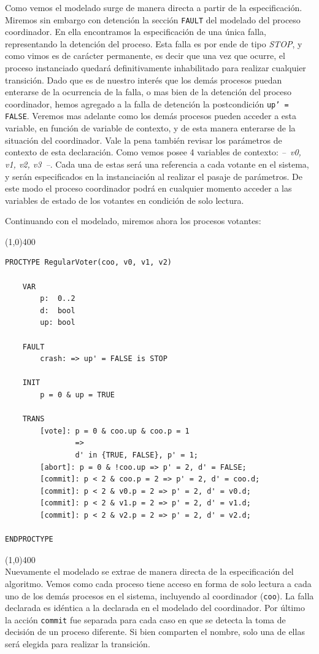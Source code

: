 \documentclass[pdftex,a4paper,12pt]{book}
\begin{document}
Como vemos el modelado surge de manera directa a partir de la especificaci\'on. Miremos sin embargo con detenci\'on la secci\'on \texttt{FAULT} del modelado del proceso coordinador. En ella encontramos la especificaci\'on de una \'unica falla, representando la detenci\'on del proceso. Esta falla es por ende de tipo \textit{STOP}, y como vimos es de car\'acter permanente, es decir que una vez que ocurre, el proceso instanciado quedar\'a definitivamente inhabilitado para realizar cualquier transici\'on. Dado que es de nuestro inter\'es que los dem\'as procesos puedan enterarse de la ocurrencia de la falla, o mas bien de la detenci\'on del proceso coordinador, hemos agregado a la falla de detenci\'on la postcondici\'on \texttt{up' = FALSE}. Veremos mas adelante como los dem\'as procesos pueden acceder a esta variable, en funci\'on de variable de contexto, y de esta manera enterarse de la situaci\'on del coordinador. Vale la pena tambi\'en revisar los par\'ametros de contexto de esta declaraci\'on. Como vemos posee 4 variables de contexto: \textit{--~v0, v1, v2, v3~--}. Cada una de estas ser\'a una referencia a cada votante en el sistema, y ser\'an especificados en la instanciaci\'on al realizar el pasaje de par\'ametros. De este modo el proceso coordinador podr\'a en cualquier momento acceder a las variables de estado de los votantes en condici\'on de solo lectura.

Continuando con el modelado, miremos ahora los procesos votantes:

\noindent \line(1,0){400}
\begin{verbatim}
PROCTYPE RegularVoter(coo, v0, v1, v2)
    
    VAR
        p:  0..2
        d:  bool
        up: bool

    FAULT
        crash: => up' = FALSE is STOP
    
    INIT
        p = 0 & up = TRUE

    TRANS
        [vote]: p = 0 & coo.up & coo.p = 1
                => 
                d' in {TRUE, FALSE}, p' = 1;
        [abort]: p = 0 & !coo.up => p' = 2, d' = FALSE;
        [commit]: p < 2 & coo.p = 2 => p' = 2, d' = coo.d;
        [commit]: p < 2 & v0.p = 2 => p' = 2, d' = v0.d;
        [commit]: p < 2 & v1.p = 2 => p' = 2, d' = v1.d;
        [commit]: p < 2 & v2.p = 2 => p' = 2, d' = v2.d;

ENDPROCTYPE
\end{verbatim}
\line(1,0){400}
~\\

Nuevamente el modelado se extrae de manera directa de la especificaci\'on del algoritmo. Vemos como cada proceso tiene acceso en forma de solo lectura a cada uno de los dem\'as procesos en el sistema, incluyendo al coordinador (\texttt{coo}). La falla declarada es id\'entica a la declarada en el modelado del coordinador. Por \'ultimo la acci\'on \texttt{commit} fue separada para cada caso en que se detecta la toma de decisi\'on de un proceso diferente. Si bien comparten el nombre, solo una de ellas ser\'a elegida para realizar la transici\'on.
\end{document}
